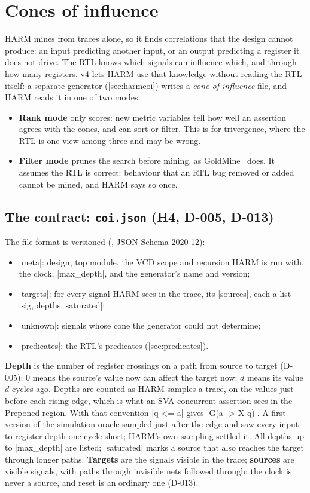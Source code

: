 \section{Cones of influence}\label{sec:coi}
HARM mines from traces alone, so it finds correlations that the design cannot produce: an input predicting another input, or an output predicting a register it does not drive. The RTL knows which signals can influence which, and through how many registers. v4 lets HARM use that knowledge without reading the RTL itself: a separate generator (\cref{sec:harmcoi}) writes a \emph{cone-of-influence} file, and HARM reads it in one of two modes.
\begin{itemize}
\item \textbf{Rank mode} only scores: new metric variables tell how well an assertion agrees with the cones, and can sort or filter. This is for trivergence, where the RTL is one view among three and may be wrong.
\item \textbf{Filter mode} prunes the search before mining, as GoldMine~\cite{goldmine} does. It assumes the RTL is correct: behaviour that an RTL bug removed or added cannot be mined, and HARM says so once.
\end{itemize}

\subsection{The contract: \texttt{coi.json} (H4, D-005, D-013)}
The file format is versioned (, JSON Schema 2020-12):
\begin{itemize}
\item \code|meta|: design, top module, the VCD scope and recursion HARM is run with, the clock, \code|max_depth|, and the generator's name and version;
\item \code|targets|: for every signal HARM sees in the trace, its \code|sources|, each a list \code|{sig, depths, saturated}|;
\item \code|unknown|: signals whose cone the generator could not determine;
\item \code|predicates|: the RTL's predicates (\cref{sec:predicates}).
\end{itemize}
\textbf{Depth} is the number of register crossings on a path from source to target (D-005): 0 means the source's value now can affect the target now; $d$ means its value $d$ cycles ago. Depths are counted as HARM samples a trace, on the values just before each rising edge, which is what an SVA concurrent assertion sees in the Preponed region. With that convention \code|q <= a| gives \code|G(a -> X q)|. A first version of the simulation oracle sampled just after the edge and saw every input-to-register depth one cycle short; HARM's own sampling settled it. All depths up to \code|max_depth| are listed; \code|saturated| marks a source that also reaches the target through longer paths.
\textbf{Targets} are the signals visible in the trace; \textbf{sources} are visible signals, with paths through invisible nets followed through; the clock is never a source, and reset is an ordinary one (D-013).

